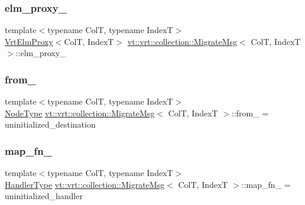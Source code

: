 \subsubsection{\texorpdfstring{elm\+\_\+proxy\+\_\+}{elm\_proxy\_}}
{\footnotesize\ttfamily template$<$typename ColT, typename IndexT$>$ \\
\hyperlink{structvt_1_1vrt_1_1collection_1_1_vrt_elm_proxy}{Vrt\+Elm\+Proxy}$<$ColT, IndexT$>$ \hyperlink{structvt_1_1vrt_1_1collection_1_1_migrate_msg}{vt\+::vrt\+::collection\+::\+Migrate\+Msg}$<$ ColT, IndexT $>$\+::elm\+\_\+proxy\+\_\+\hspace{0.3cm}{\ttfamily [private]}}

\mbox{\label{structvt_1_1vrt_1_1collection_1_1_migrate_msg_a1b6255e6321bcac5244caf9f01c1fb47}} 
\subsubsection{\texorpdfstring{from\+\_\+}{from\_}}
{\footnotesize\ttfamily template$<$typename ColT, typename IndexT$>$ \\
\hyperlink{namespacevt_a866da9d0efc19c0a1ce79e9e492f47e2}{Node\+Type} \hyperlink{structvt_1_1vrt_1_1collection_1_1_migrate_msg}{vt\+::vrt\+::collection\+::\+Migrate\+Msg}$<$ ColT, IndexT $>$\+::from\+\_\+ = uninitialized\+\_\+destination\hspace{0.3cm}{\ttfamily [private]}}

\mbox{\label{structvt_1_1vrt_1_1collection_1_1_migrate_msg_a9ceb1e051ce61da4c6ad5689ec88935e}} 
\subsubsection{\texorpdfstring{map\+\_\+fn\+\_\+}{map\_fn\_}}
{\footnotesize\ttfamily template$<$typename ColT, typename IndexT$>$ \\
\hyperlink{namespacevt_af64846b57dfcaf104da3ef6967917573}{Handler\+Type} \hyperlink{structvt_1_1vrt_1_1collection_1_1_migrate_msg}{vt\+::vrt\+::collection\+::\+Migrate\+Msg}$<$ ColT, IndexT $>$\+::map\+\_\+fn\+\_\+ = uninitialized\+\_\+handler\hspace{0.3cm}{\ttfamily [private]}}

